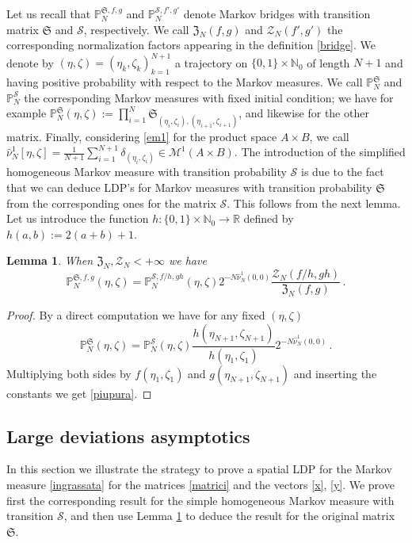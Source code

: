\documentclass[reqno]{amsart}
\theoremstyle{plain}
\newtheorem{lemma}[theorem]{Lemma}
\theoremstyle{definition}
\theoremstyle{remark}
\numberwithin{equation}{section}
\numberwithin{theorem}{section}
\renewcommand{\hat}{\widehat}
\newcommand{\<}{\langle}
\renewcommand{\>}{\rangle}
\begin{document}
	\smallskip
	
	
	
	
	Let us recall  that $\mathbb P^{\mathfrak S, f,g}_{N}$ and $\mathbb P^{\mathcal S,f',g'}_{N}$ denote Markov bridges with transition matrix $\mathfrak S$ and $\mathcal S$, respectively. We call $\mathfrak Z_N(f,g)$ and $\mathcal Z_N(f',g')$ the corresponding normalization factors appearing in the definition \eqref{bridge}. We denote by $(\eta,\zeta)=(\eta_k,\zeta_k)_{k=1}^{N+1}$ a trajectory on $\{0,1\}\times \mathbb N_0$ of length $N+1$ and having positive probability with respect to the Markov measures. We call $\mathbb P^{\mathfrak S}_{N}$ and $\mathbb P^{\mathcal S}_{N}$ the corresponding Markov measures with fixed initial condition; we have for example
	$\mathbb P^{\mathfrak S}_{N}(\eta,\zeta):=\prod_{i=1}^{N}\mathfrak S_{(\eta_i,\zeta_i),(\eta_{i+1},\zeta_{i+1})}$, and likewise for the other matrix.
	Finally, considering \eqref{em1} for the product space $A\times B$, we call $\hat{\nu}^1_N[\eta,\zeta]=\frac{1}{N+1} \sum_{i=1}^{N+1}\delta_{(\eta_i,\zeta_i)}\in \mathcal M^1(A\times B)$. The introduction of the simplified homogeneous Markov measure with transition probability $\mathcal S$ is due to the fact that we can deduce LDP's for Markov measures with transition probability $\mathfrak S$ from the corresponding ones for the matrix $\mathcal S$. This follows from the next lemma. Let us introduce the function $h:\{0,1\}\times \mathbb N_0\to \mathbb R$ defined by $h(a,b):=2(a+b)+1$.
	\begin{lemma}\label{lemmastorto}
		When $\mathfrak Z_N, \mathcal Z_N<+\infty$ we have
		\begin{equation}\label{piupura}
			\mathbb P^{\mathfrak S, f,g}_{N}(\eta,\zeta)=\mathbb P^{\mathcal S,f/h,gh}_{N}(\eta,\zeta)2^{-N\hat{\nu}_N^1(0,0)}\frac{\mathcal Z_N(f/h,gh)}{\mathfrak Z_N(f,g)}\,.
		\end{equation}
	\end{lemma}
	\begin{proof}
		By a direct computation we have for any fixed $(\eta,\zeta)$
		$$
		\mathbb P^{\mathfrak S}_{N}(\eta,\zeta)=\mathbb P^{\mathcal S}_{N}(\eta,\zeta)\frac{h(\eta_{N+1},\zeta_{N+1})}{h(\eta_1,\zeta_1)}2^{-N\hat{\nu}_N^1(0,0)}\,.
		$$
		Multiplying both sides by $f(\eta_1,\zeta_1)$ and $g(\eta_{N+1},\zeta_{N+1})$ and inserting the constants we get 
		\eqref{piupura}.
	\end{proof}
	
	
	\subsection{Large deviations asymptotics}
	In this section we illustrate the strategy to prove a spatial LDP for the Markov measure \eqref{ingrassata} for the matrices \eqref{matrici} and the vectors \eqref{x}, \eqref{y}. We prove first the corresponding result for the simple homogeneous Markov measure with transition $\mathcal S$, and then use Lemma \ref{lemmastorto}
	to deduce the result for the original matrix $\mathfrak S$. 
	
\end{document}
